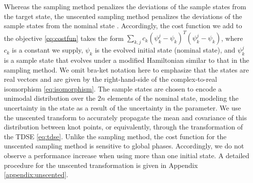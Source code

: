 Whereas the sampling method penalizes the deviations of the sample states
from the target state, the unscented sampling method
penalizes the deviations of the sample states from the nominal state
\cite{howell2020direct, lee2013sigma,
  thangavel2020robust}. Accordingly, the cost function we add
to the objective \eqref{eq:costfun} takes the form
$\sum_{k, j} c_{k} (\psi^{j}_{k} - \psi_{k})^{T}
(\psi^{j}_{k} - \psi_{k})$, where $c_{k}$ is a
constant we supply, $\psi_{k}$ is
the evolved initial state (nominal state), and $\psi^{j}_{k}$ is a sample state
that evolves under a modified Hamiltonian similar to that in the sampling method.
We omit bra-ket notation here to emphasize that
the states are real vectors and are given by the right-hand-side of the
complex-to-real isomorphism \eqref{eq:isomorphism}.
The sample states are chosen to encode a unimodal distribution over
the $2n$ elements of the nominal state, modeling the uncertainty in the state
as a result of the uncertainty in the parameter. We use the unscented transform
\cite{julier2004unscented, uhlmann1995dynamic}
to accurately propagate the mean and covariance of this distribution between
knot points, or equivalently, through the transformation of the TDSE \eqref{eq:tdse}.
Unlike the sampling method, the cost function for the unscented sampling method
is sensitive to global phases. Accordingly, we
do not observe a performance increase when
using more than one initial state. 
A detailed procedure for the unscented transformation is given
in Appendix \ref{appendix:unscented}.

